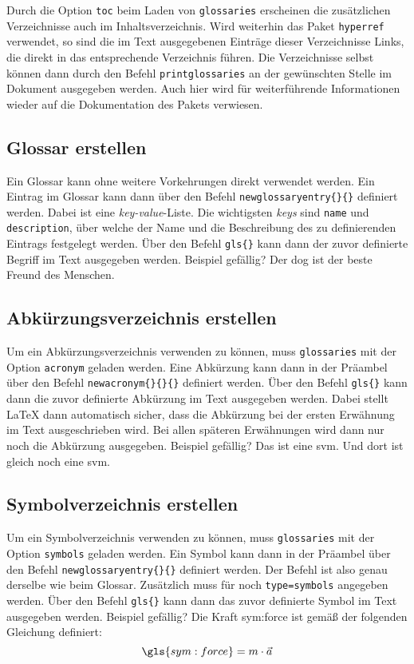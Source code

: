 Durch die Option \texttt{toc} beim Laden von \texttt{glossaries} erscheinen
die zusätzlichen Verzeichnisse auch im Inhaltsverzeichnis. Wird weiterhin
das Paket \texttt{hyperref} verwendet, so sind die im Text ausgegebenen
Einträge dieser Verzeichnisse Links, die direkt in das entsprechende 
Verzeichnis führen. Die Verzeichnisse selbst können dann durch den Befehl
\texttt{\tb printglossaries} an der gewünschten Stelle im Dokument ausgegeben
werden. Auch hier wird für weiterführende Informationen wieder auf die
Dokumentation des Pakets verwiesen.

\subsection{Glossar erstellen}
Ein Glossar kann ohne weitere Vorkehrungen direkt verwendet werden.
Ein Eintrag im Glossar kann dann über den Befehl
\texttt{\tb newglossaryentry\{\}\{\}}
definiert werden. Dabei ist  eine \emph{key-value}-Liste.
Die wichtigsten \emph{keys} sind \texttt{name} und \texttt{description}, über 
welche
der Name und die Beschreibung des zu definierenden Eintrags festgelegt werden.
Über den Befehl \texttt{\tb gls\{\}} kann dann der zuvor
definierte Begriff im Text ausgegeben werden. Beispiel gefällig? Der
\gls{dog} ist der beste Freund des Menschen.


\subsection{Abkürzungsverzeichnis erstellen}
Um ein Abkürzungsverzeichnis verwenden zu können, muss \texttt{glossaries} mit 
der Option
\texttt{acronym} geladen werden. Eine Abkürzung kann dann in der Präambel über 
den Befehl \texttt{\tb newacronym\{\}\{\}\{\}}  definiert werden. Über den Befehl
\texttt{\tb gls\{\}} kann dann die zuvor definierte Abkürzung
im Text ausgegeben werden. Dabei stellt \LaTeX{} dann automatisch sicher, dass
die Abkürzung bei der ersten Erwähnung im Text ausgeschrieben wird. Bei allen
späteren Erwähnungen wird dann nur noch die Abkürzung ausgegeben. Beispiel
gefällig? Das ist eine \gls{svm}. Und dort ist gleich noch eine \gls{svm}. 

\subsection{Symbolverzeichnis erstellen}
Um ein Symbolverzeichnis verwenden zu können, muss \texttt{glossaries} mit
der Option \texttt{symbols} geladen werden. Ein Symbol kann dann in der 
Präambel über den Befehl
\texttt{\tb newglossaryentry\{\}\{\}}
definiert werden. Der Befehl ist also genau derselbe wie beim Glossar.
Zusätzlich muss für  noch \texttt{type=symbols} angegeben
werden. Über den Befehl \texttt{\tb gls\{\}} kann dann das zuvor
definierte Symbol im Text ausgegeben werden. Beispiel gefällig? Die Kraft \gls{sym:force} ist gemäß der folgenden Gleichung definiert:
\begin{equation*}
	\gls{sym:force}=m\cdot \vec{a}
\end{equation*}


